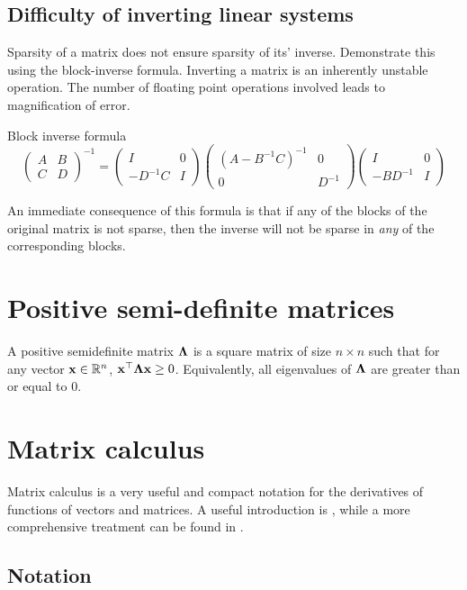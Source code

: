 \documentclass{amsart}[12pt]
\begin{document}
\subsection{Difficulty of inverting linear systems}

Sparsity of a matrix does not ensure sparsity of its' inverse. Demonstrate this using the block-inverse
formula.
Inverting a matrix is an inherently unstable operation. The number of floating point operations involved
leads to magnification of error.

Block inverse formula \\
\[
	\begin{pmatrix}
	A & B \\
	C & D
	\end{pmatrix}^{-1}
	=
	\begin{pmatrix}
	I & 0 \\
	-D^{-1} C & I
	\end{pmatrix}
	\begin{pmatrix}
	(A - B^{-1}C)^{-1} & 0 \\
	0 & D^{-1}
	\end{pmatrix}
	\begin{pmatrix}
	I & 0 \\
	-BD^{-1} & I
	\end{pmatrix}
\]

An immediate consequence of this formula is that if any of the blocks of the original matrix is not sparse,
then the inverse will not be sparse in \emph{any} of the corresponding blocks.

\section{Positive semi-definite matrices}
A positive semidefinite matrix ${\boldsymbol \Lambda}$ is a square matrix of size $n \times n$ such that for any vector
${\bf x} \in {\mathbb{R}}^n$, ${\bf x}^\top {\boldsymbol\Lambda} {\bf x} \geq 0$. Equivalently, all eigenvalues of ${\boldsymbol \Lambda}$ are greater than or 
equal to 0.

\section{Matrix calculus}

Matrix calculus is a very useful and compact notation for the derivatives of functions of vectors and matrices.
A useful introduction is \cite{wand02}, while a more comprehensive treatment can be found in
\cite{MagnusNeudecker99}.

\subsection{Notation}
\end{document}
